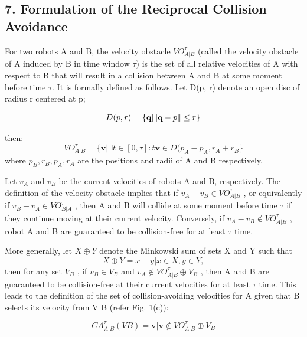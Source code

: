 \documentclass[12pt]{report}
\begin{document}
\begin{center}
\chapter*{7.  Formulation of the Reciprocal Collision Avoidance}
\end{center}

For two robots A and B, the velocity obstacle $VO^{\tau}_{A|B}$ (called the velocity obstacle of A induced by B in time window $\tau$) is the set of all relative velocities of A with respect to B that will result in a collision between A and B at some moment before time $\tau$. It is formally defined as follows. Let D(p, r) denote an open disc of radius r centered at p;

\begin{equation}
D(p,r) = \{\textbf{q}| \norm{\textbf{q}-p} \leq r\}
\end{equation}

then:
\begin{equation}
VO^{\tau}_{A|B} = \{\textbf{v}|\exists t \in [0,\tau]: t\textbf{v} \in D(p_{A}-p_{A}, r_{A}+r_{B}\} 
\end{equation}
where $p_{B}, r_{B}, p_{A}, r_{A}$ are the positions and radii of A and B respectively.


Let $v_{A}$ and $v_{B}$ be the current velocities of robots A and B, respectively. The 
definition of the velocity obstacle implies that if $v_{A} - v_{B} \in VO^{\tau}_{A|B}$ , or equivalently if $v_{B} - v_{A} \in VO^{\tau}_{B|A}$ , then A and B will collide at some moment before time $\tau$ if they continue moving at their current velocity. Conversely, if $v_{A} - v_{B} \notin VO^{\tau}_{A|B}$ , robot A and B are guaranteed to be collision-free for at least $\tau$ time. 

More generally, let $X \oplus Y$ denote the Minkowski sum of sets X and Y such that
\begin{equation}
X \oplus Y = {x + y | x \in X, y \in Y },
\end{equation}
then for any set $V_{B}$ , if $v_{B} \in V_{B}$ and $v_{A} \notin VO^{\tau}_{A|B} \oplus V_{B}$ , then A and B are guaranteed to be collision-free at their current velocities for at least $\tau$ time. This leads to the definition of the set of collision-avoiding velocities for A given that B selects its velocity from V B (refer Fig. 1(c)):

\begin{equation}
CA^{\tau}_{A|B}(V B ) = {\textbf{v} | \textbf{v} \notin VO^{\tau}_{A|B} \oplus V_{B} }
\end{equation}
\end{document}

